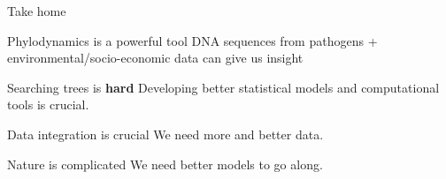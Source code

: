 \documentclass[newPxFont,numfooter,sectionpages]{beamer}
\begin{document}
\begin{frame}{Take home}
\begin{exampleblock}{Phylodynamics is a powerful tool}
DNA sequences from pathogens + environmental/socio-economic data can give us insight
\end{exampleblock}\pause
\begin{alertblock}{Searching trees is \textbf{hard}}
Developing better statistical models and computational tools is crucial.
\end{alertblock}\pause
\begin{block}{Data integration is crucial}
 We need more and better data.
\end{block}\pause
\begingroup
{}
\begin{block}{Nature is complicated}
We need better models to go along.
\end{block}
\endgroup
\end{frame}

\begingroup
{}
\begin{frame}[plain]


\end{frame}
\endgroup
\end{document}
